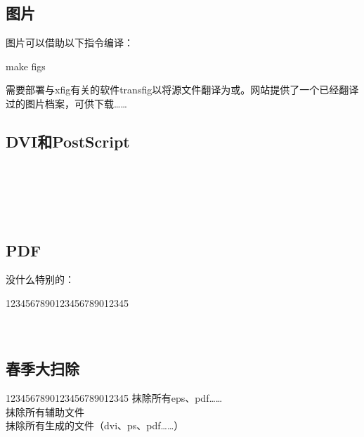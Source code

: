 \subsection{图片}

图片可以借助以下指令编译：

\begin{dmd}
make figs
\end{dmd}

\begin{exclamation}
需要部署与xfig有关的软件transfig以将源文件翻译为或。网站\linebreak {}提供了一个已经翻译过的图片档案，可供下载……
\end{exclamation}

\subsection{DVI和PostScript}

\begin{tabbing}
\\
\\
\\
\\
\end{tabbing}

\subsection{PDF}

没什么特别的：

\begin{tabbing}
1234567890123456789012345\= \kill
{}\\
\\
\\
\end{tabbing}

\subsection{春季大扫除}

\begin{tabbing}
1234567890123456789012345\= \kill
{}\> \leftarrow 抹除所有eps、pdf……\\
\> \leftarrow 抹除所有辅助文件\\
\> \leftarrow 抹除所有生成的文件（dvi、ps、pdf……）
\end{tabbing}
